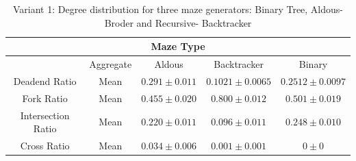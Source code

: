 \begin{table}[!h]
    \begin{center} 
        \caption{Variant 1: Degree distribution for three maze generators: Binary Tree, Aldous-Broder and Recursive- Backtracker} 
    \begin{tabular}{ c c c c c} 
    \multicolumn{5}{c}{Maze Type} \\
    \hline
    &Aggregate&Aldous&Backtracker&Binary\\
    \hline
Deadend Ratio&Mean&$0.291\pm 0.011$&$0.1021\pm 0.0065$&$0.2512\pm 0.0097$\\    
    \hline
Fork Ratio&Mean&$0.455\pm 0.020$&$0.800\pm 0.012$&$0.501\pm 0.019$\\
    \hline
Intersection Ratio&Mean&$0.220\pm 0.011$&$0.096\pm 0.011$&$0.248\pm 0.010$\\    
    \hline
Cross Ratio&Mean&$0.034\pm 0.006$&$0.001\pm 0.001$&$0\pm 0$\\    
    \hline   
     \end{tabular} 
    \end{center}
     \end{table}

